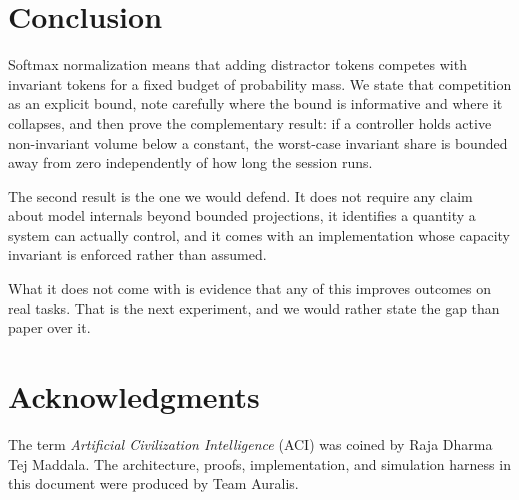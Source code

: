 ﻿\documentclass[11pt,a4paper]{article}
\theoremstyle{plain}
\theoremstyle{definition}
\theoremstyle{remark}
\begin{document}
\section{Conclusion}
\label{sec:conclusion}

Softmax normalization means that adding distractor tokens competes with
invariant tokens for a fixed budget of probability mass. We state that
competition as an explicit bound, note carefully where the bound is informative
and where it collapses, and then prove the complementary result: if a controller
holds active non-invariant volume below a constant, the worst-case invariant
share is bounded away from zero independently of how long the session runs.

The second result is the one we would defend. It does not require any claim about
model internals beyond bounded projections, it identifies a quantity a system can
actually control, and it comes with an implementation whose capacity invariant is
enforced rather than assumed.

What it does not come with is evidence that any of this improves outcomes on real
tasks. That is the next experiment, and we would rather state the gap than paper
over it.

\section*{Acknowledgments}

The term \emph{Artificial Civilization Intelligence} (ACI) was coined by Raja
Dharma Tej Maddala. The architecture, proofs, implementation, and simulation
harness in this document were produced by Team Auralis.
\end{document}
